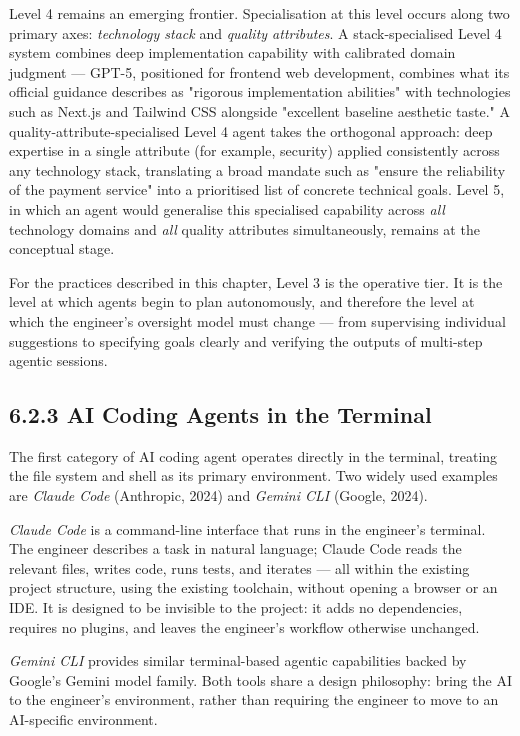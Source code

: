 \documentclass[11pt,a4paper]{book}
\begin{document}
Level 4 remains an emerging frontier. Specialisation at this level occurs along two primary axes: \textit{technology stack} and \textit{quality attributes}. A stack-specialised Level 4 system combines deep implementation capability with calibrated domain judgment --- GPT-5, positioned for frontend web development, combines what its official guidance describes as "rigorous implementation abilities" with technologies such as Next.js and Tailwind CSS alongside "excellent baseline aesthetic taste." A quality-attribute-specialised Level 4 agent takes the orthogonal approach: deep expertise in a single attribute (for example, security) applied consistently across any technology stack, translating a broad mandate such as "ensure the reliability of the payment service" into a prioritised list of concrete technical goals. Level 5, in which an agent would generalise this specialised capability across \textit{all} technology domains and \textit{all} quality attributes simultaneously, remains at the conceptual stage.

For the practices described in this chapter, Level 3 is the operative tier. It is the level at which agents begin to plan autonomously, and therefore the level at which the engineer's oversight model must change --- from supervising individual suggestions to specifying goals clearly and verifying the outputs of multi-step agentic sessions.

\subsection{6.2.3 AI Coding Agents in the Terminal}

The first category of AI coding agent operates directly in the terminal, treating the file system and shell as its primary environment. Two widely used examples are \textit{Claude Code} (Anthropic, 2024) and \textit{Gemini CLI} (Google, 2024).

\textit{Claude Code} is a command-line interface that runs in the engineer's terminal. The engineer describes a task in natural language; Claude Code reads the relevant files, writes code, runs tests, and iterates --- all within the existing project structure, using the existing toolchain, without opening a browser or an IDE. It is designed to be invisible to the project: it adds no dependencies, requires no plugins, and leaves the engineer's workflow otherwise unchanged.

\textit{Gemini CLI} provides similar terminal-based agentic capabilities backed by Google's Gemini model family. Both tools share a design philosophy: bring the AI to the engineer's environment, rather than requiring the engineer to move to an AI-specific environment.
\end{document}
